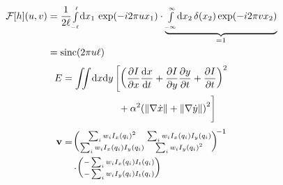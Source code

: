 {}
\begin{equation}
	\begin{split}
		\mathcal{F}[h](u,v)&=\frac{1}{2\ell}{\scriptstyle\int\limits_{-\ell}^{\ell}}\mathrm d x_1\, \exp\!\left( -i2\pi ux_1 \right)
		\cdot\underbrace{{\scriptstyle\int\limits_{-\infty}^{\infty}}\mathrm d x_2\, \delta(x_2)\exp\!\left( -i2\pi vx_2 \right)}_{=1}\\
		&=\operatorname{sinc}\!\left(2\pi u\ell  \right)
	\end{split}
	\label{eq:motionblur1}
\end{equation}
\begin{equation}
	\begin{split}
		E&=\iint_{}^{}\!\dd{x}\!\dd{y}\left[\left( \pdv{I}{x}\dv{x}{t}+\pdv{I}{y}\pdv{y}{t}+\pdv{I}{t} \right)^2\right.\\
			&\hphantom{\iint_{}^{}\!\dd{x}\!\dd{y}\left[\right.\quad}\left.\vphantom{\iint_{}^{}\!\dd{x}\!\dd{y}\left[\left( \pdv{I}{x}\dv{x}{t}+\pdv{I}{y}\pdv{y}{t}+\pdv{I}{t} \right)^2\right.}
	+\alpha^2\!\left( \norm{\nabla \dot{x}} +\norm{\nabla\dot{y}}\right)^2  \right]
	\end{split}
	\label{eq:2dimstreams}
\end{equation}
\begin{equation}
	\begin{split}
		\vtr{v}&=
		\!{\left(\!\begin{smallmatrix}
			\sum_{i}^{}w_iI_x(q_i)^2&\sum_{i}^{}w_iI_x(q_i)I_y(q_i)\\
			\sum_{i}^{}w_iI_x(q_i)I_y(q_i)&\sum_{i}^{}w_iI_y(q_i)^2
		\end{smallmatrix}\!
	\right)\!}^{-1}\\
	&\quad\cdot 
	\!\left(\!\begin{smallmatrix}
		-\sum_{i}^{}w_iI_x(q_i)I_t(q_i)\\
		-\sum_{i}^{}w_iI_y(q_i)I_t(q_i)
	\end{smallmatrix}\!\right)\!
	\label{eq:lucaskanade2}
	\end{split}
\end{equation}
